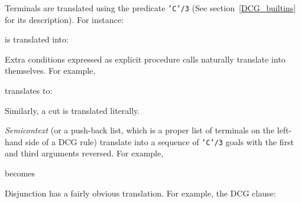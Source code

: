 Terminals are translated using the predicate {\tt 'C'/3} (See 
section~\ref{DCG_builtins} for its description).  For instance:


\noindent
is translated into:


Extra conditions expressed as explicit procedure calls naturally translate
into themselves. For example,


\noindent
translates to:


Similarly, a cut is translated literally.

{\em Semicontext} (or a push-back list, which is a proper list of
terminals on the left-hand side of a DCG rule) translate into a
sequence of {\tt 'C'/3} goals with the first and third arguments
reversed.  For example,


\noindent
becomes


Disjunction has a fairly obvious translation.  For example, the DCG clause:

